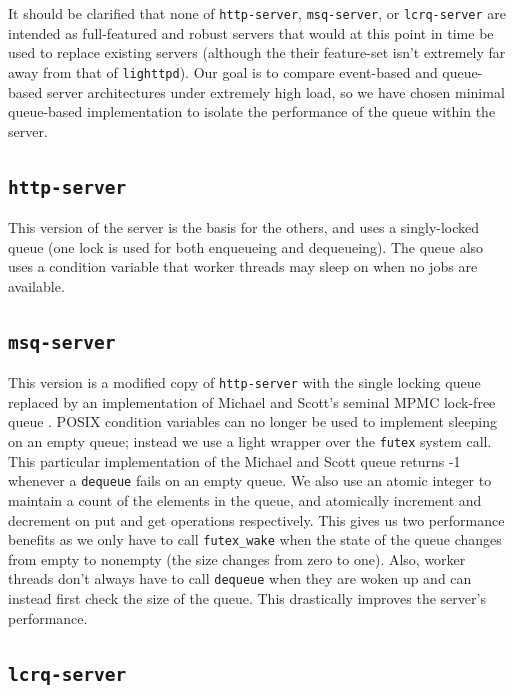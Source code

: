 \documentclass[twoside,10pt]{article}
\begin{document}
\begin{multicols}{2}
It should be clarified that none of \verb+http-server+,
\verb+msq-server+, or \verb+lcrq-server+ are intended as full-featured
and robust servers that would at this point in time be used to replace
existing servers (although the their feature-set isn't extremely far
away from that of \verb+lighttpd+). Our goal is to compare event-based
and queue-based server architectures under extremely high load, so we
have chosen minimal queue-based implementation to isolate the
performance of the queue within the server.

\subsection{\texttt{http-server}}

This version of the server is the basis for the others, and uses a
singly-locked queue (one lock is used for both enqueueing and
dequeueing). The queue also uses a condition variable that worker
threads may sleep on when no jobs are available.

\subsection{\texttt{msq-server}}

This version is a modified copy of \verb+http-server+ with the single
locking queue replaced by an implementation of Michael and Scott's
seminal MPMC lock-free queue \cite{synch-1.0.1}. POSIX
condition variables can no longer be used to implement sleeping on an
empty queue; instead we use a light wrapper over the \verb+futex+ system
call. This particular implementation of the Michael and Scott queue
returns -1 whenever a \verb+dequeue+ fails on an empty queue. We also use an
atomic integer to maintain a count of the elements in the queue, and atomically increment and decrement on put and get operations respectively. This gives us two performance benefits as we only have to call \verb+futex_wake+
when the state of the queue changes from empty to nonempty (the size changes from zero to one). Also, worker threads don't always have to call \verb+dequeue+ 
when they are woken up and can instead first check the size of the queue. This
drastically improves the server's performance. 

\subsection{\texttt{lcrq-server}}


\end{multicols}
\end{document}
